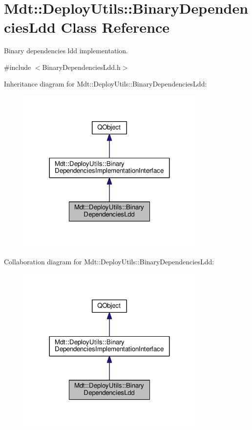 \hypertarget{class_mdt_1_1_deploy_utils_1_1_binary_dependencies_ldd}{}\section{Mdt\+:\+:Deploy\+Utils\+:\+:Binary\+Dependencies\+Ldd Class Reference}
\label{class_mdt_1_1_deploy_utils_1_1_binary_dependencies_ldd}


Binary dependencies ldd implementation.  




{\ttfamily \#include $<$Binary\+Dependencies\+Ldd.\+h$>$}



Inheritance diagram for Mdt\+:\+:Deploy\+Utils\+:\+:Binary\+Dependencies\+Ldd\+:
\nopagebreak
\begin{figure}[H]
\begin{center}
\leavevmode
\includegraphics[width=264pt]{class_mdt_1_1_deploy_utils_1_1_binary_dependencies_ldd__inherit__graph}
\end{center}
\end{figure}


Collaboration diagram for Mdt\+:\+:Deploy\+Utils\+:\+:Binary\+Dependencies\+Ldd\+:
\nopagebreak
\begin{figure}[H]
\begin{center}
\leavevmode
\includegraphics[width=264pt]{class_mdt_1_1_deploy_utils_1_1_binary_dependencies_ldd__coll__graph}
\end{center}
\end{figure}
